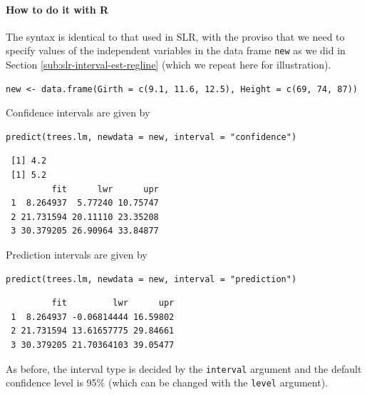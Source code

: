 \documentclass[captions=tableheading]{scrbook}
\begin{document}
\paragraph*{How to do it with \textsf{R}}

The syntax is identical to that used in SLR, with the proviso that we need to specify values of the independent variables in the data frame \texttt{new} as we did in Section \ref{sub:slr-interval-est-regline} (which we repeat here for illustration).


\begin{verbatim}
new <- data.frame(Girth = c(9.1, 11.6, 12.5), Height = c(69, 74, 87))
\end{verbatim}

Confidence intervals are given by


\begin{verbatim}
predict(trees.lm, newdata = new, interval = "confidence")
\end{verbatim}

\begin{verbatim}
 [1] 4.2
 [1] 5.2
         fit      lwr      upr
 1  8.264937  5.77240 10.75747
 2 21.731594 20.11110 23.35208
 3 30.379205 26.90964 33.84877
\end{verbatim}



Prediction intervals are given by


\begin{verbatim}
predict(trees.lm, newdata = new, interval = "prediction")
\end{verbatim}

\begin{verbatim}
         fit         lwr      upr
 1  8.264937 -0.06814444 16.59802
 2 21.731594 13.61657775 29.84661
 3 30.379205 21.70364103 39.05477
\end{verbatim}



As before, the interval type is decided by the \texttt{interval} argument and the default confidence level is 95\% (which can be changed with the \texttt{level} argument).
\end{document}
